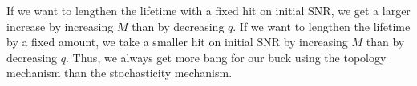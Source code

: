 \documentclass[12pt]{article}
\begin{document}
If we want to lengthen the lifetime with a fixed hit on initial SNR, we get a larger increase by increasing $M$ than by decreasing $q$.
If we want to lengthen the lifetime by a fixed amount, we take a smaller hit on initial SNR by increasing $M$ than by decreasing $q$.
Thus, we always get more bang for our buck using the topology mechanism than the stochasticity mechanism.













\end{document}
